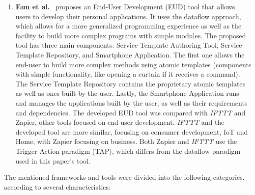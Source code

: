 \begin{enumerate}
    \item \textbf{Eun et al.}~\cite{eud_platform} proposes an End-User Development (EUD) tool that allows users to develop their personal applications. It uses the dataflow approach, which allows for a more generalized programming experience as well as the facility to build more complex programs with simple modules. The proposed tool has three main components: Service Template Authoring Tool, Service Template Repository, and Smartphone Application. The first one allows the end-user to build more complex methods using atomic templates (components with simple functionality, like opening a curtain if it receives a command). The Service Template Repository contains the proprietary atomic templates as well as ones built by the user. Lastly, the Smartphone Application runs and manages the applications built by the user, as well as their requirements and dependencies. The developed EUD tool was compared with \textit{IFTTT} and Zapier, other tools focused on end-user development. \textit{IFTTT} and the developed tool are more similar, focusing on consumer development, IoT and Home, with Zapier focusing on business. Both Zapier and \textit{IFTTT} use the Trigger-Action paradigm (TAP), which differs from the dataflow paradigm used in this paper's tool.
\end{enumerate}

The mentioned frameworks and tools were divided into the following categories, according to several characteristics:

